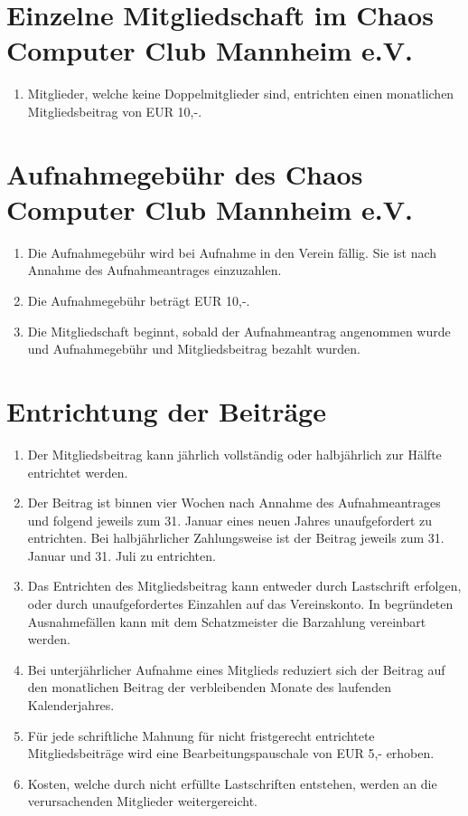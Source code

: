 \documentclass[a4paper, 12pt]{scrartcl}
\begin{document}
\section{Einzelne Mitgliedschaft im Chaos Computer Club Mannheim e.V.}
\label{mitgliedsbeitrag}
\begin{enumerate}
	\item Mitglieder, welche keine Doppelmitglieder sind, entrichten einen monatlichen Mitgliedsbeitrag von EUR 10,-.
\end{enumerate}

\section{Aufnahmegebühr des Chaos Computer Club Mannheim e.V.}
\begin{enumerate}
	\item Die Aufnahmegebühr wird bei Aufnahme in den Verein fällig. Sie ist nach Annahme des Aufnahmeantrages einzuzahlen. 
	\item Die Aufnahmegebühr beträgt EUR 10,-.
	\item Die Mitgliedschaft beginnt, sobald der Aufnahmeantrag angenommen wurde und Aufnahmegebühr und Mitgliedsbeitrag bezahlt wurden.
\end{enumerate}

\section{Entrichtung der Beiträge}
  \begin{enumerate}
    \item Der Mitgliedsbeitrag kann jährlich vollständig oder halbjährlich zur Hälfte entrichtet werden.
    \item Der Beitrag ist binnen vier Wochen nach Annahme des Aufnahmeantrages und folgend jeweils zum 31. Januar eines neuen Jahres unaufgefordert zu entrichten. Bei halbjährlicher Zahlungsweise ist der Beitrag jeweils zum 31. Januar und 31. Juli zu entrichten.
    \item Das Entrichten des Mitgliedsbeitrag kann entweder durch Lastschrift erfolgen, oder durch unaufgefordertes Einzahlen auf das Vereinskonto. In begründeten Ausnahmefällen kann mit dem Schatzmeister die Barzahlung vereinbart werden.
    \item Bei unterjährlicher Aufnahme eines Mitglieds reduziert sich der Beitrag auf den monatlichen Beitrag der verbleibenden Monate des laufenden Kalenderjahres.
    \item Für jede schriftliche Mahnung für nicht fristgerecht entrichtete Mitgliedsbeiträge wird eine Bearbeitungspauschale von EUR 5,- erhoben. 
    \item Kosten, welche durch nicht erfüllte Lastschriften entstehen, werden an die verursachenden Mitglieder weitergereicht.
  \end{enumerate}
\end{document}
